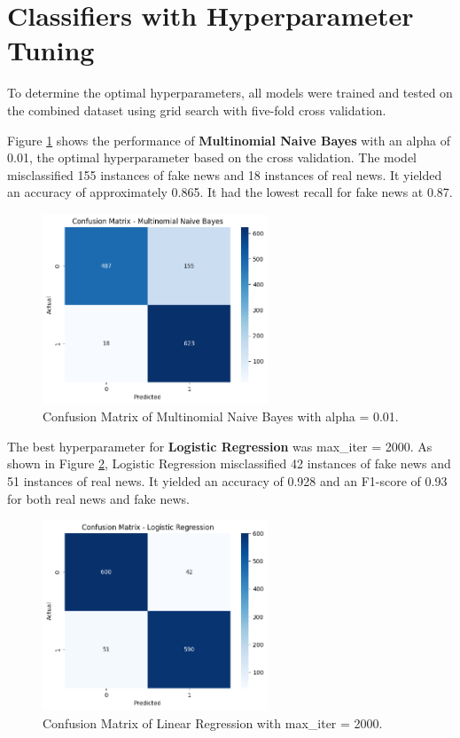 \section{Classifiers with Hyperparameter Tuning}
\label{sec:ParamTuning}
To determine the optimal hyperparameters, all models were trained and tested on the combined dataset using grid search with five-fold cross validation.

Figure \ref{MNB_hyperparam} shows the performance of \textbf{Multinomial Naive Bayes} with an alpha of 0.01, the optimal hyperparameter based on the cross validation. The model misclassified 155 instances of fake news and 18 instances of real news. It yielded an accuracy of approximately 0.865. It had the lowest recall for fake news at 0.87.

\begin{figure}[h!]
\centering
\includegraphics[width=0.6\textwidth,height=0.6\textheight, keepaspectratio]{figures/hyperparam/MNB.png}
    \caption{Confusion Matrix of Multinomial Naive Bayes with alpha = 0.01.}
    \label{MNB_hyperparam}
\end{figure}

The best hyperparameter for \textbf{Logistic Regression} was max\_iter = 2000. As shown in Figure \ref{LR_hyperparam}, Logistic Regression misclassified 42 instances of fake news and 51 instances of real news. It yielded an accuracy of 0.928 and an F1-score of 0.93 for both real news and fake news.

\begin{figure}[h!]
\centering
\includegraphics[width=0.6\textwidth,height=0.6\textheight, keepaspectratio]{figures/hyperparam/LR.png}
    \caption{Confusion Matrix of Linear Regression with max\_iter = 2000.}
    \label{LR_hyperparam}
\end{figure}

